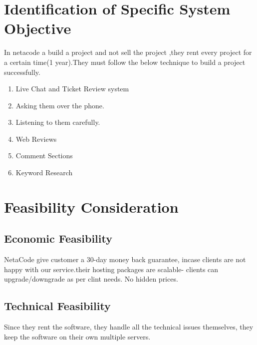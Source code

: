 \documentclass[a4paper,12pt]{book}
\begin{document}
\section{Identification of Specific System Objective}
In netacode a build a project and not sell the project ,they rent every project for a certain time(1 year).They must follow the below technique to build a project successfully.
\begin{enumerate}
	\item Live Chat and Ticket Review system
	\item Asking them over the phone.
	\item Listening to them carefully.
	\item Web Reviews
	\item Comment Sections
	\item Keyword Research
\end{enumerate}
\section{Feasibility Consideration}
\subsection{Economic Feasibility}
NetaCode give customer a 30-day money back guarantee, incase clients are not happy with our service.their hosting packages are scalable- clients can upgrade/downgrade as per clint needs.
No hidden prices.
\subsection{Technical Feasibility}
Since they rent the software, they handle all the technical issues themselves, they keep the software on their own multiple servers.
\end{document}
